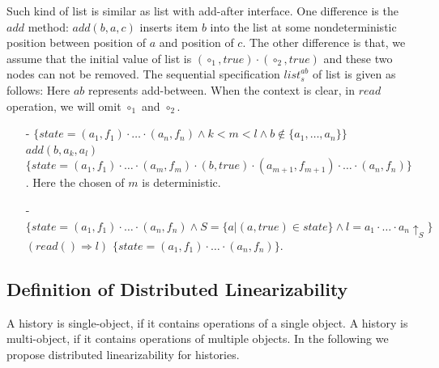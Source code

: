 \begin{example}
\label{definition:sequential specification of list with add-after interface}
Such kind of list is similar as list with add-after interface. One difference is the $\mathit{add}$ method: $\mathit{add}(b,a,c)$ inserts item $b$ into the list at some nondeterministic position between position of $a$ and position of $c$. The other difference is that, we assume that the initial value of list is $(\circ_1,\mathit{true}) \cdot (\circ_2,\mathit{true})$ and these two nodes can not be removed. The sequential specification $\mathit{list}_s^{\mathit{ab}}$ of list is given as follows: Here $\mathit{ab}$ represents add-between. When the context is clear, in $\mathit{read}$ operation, we will omit $\circ_1$ and $\circ_2$.
\begin{itemize}
\setlength{\itemsep}{0.5pt}
\item[-] $\{ \mathit{state} = (a_1,f_1) \cdot \ldots \cdot (a_n,f_n) \wedge k < m < l \wedge b \notin \{ a_1, \ldots, a_n \} \}$ $add(b,a_k,a_l)$ $\{ \mathit{state} = (a_1,f_1) \cdot \ldots \cdot (a_m,f_m) \cdot (b,\mathit{true}) \cdot (a_{m+1},f_{m+1}) \cdot \ldots \cdot (a_n,f_n) \}$. Here the chosen of $m$ is deterministic.
\item[-] $\{ \mathit{state} = (a_1,f_1) \cdot \ldots \cdot (a_n,f_n) \wedge S = \{ a \vert (a,\mathit{true}) \in \mathit{state} \} \wedge l = a_1 \cdot \ldots \cdot a_n \uparrow_{S} \}$ $(read() \Rightarrow l)$ $\{ \mathit{state} = (a_1,f_1) \cdot \ldots \cdot (a_n,f_n) \}$.
\end{itemize}
\end{example}







\subsection{Definition of Distributed Linearizability}
\label{subsec:definition of distributed linearizability}

A history is single-object, if it contains operations of a single object. A history is multi-object, if it contains operations of multiple objects. In the following we propose distributed linearizability for histories.



